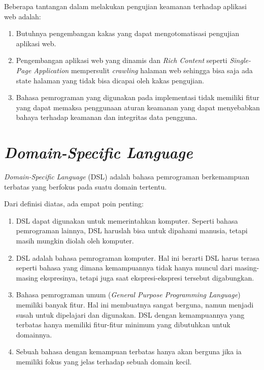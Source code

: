 Beberapa tantangan dalam melakukan pengujian keamanan terhadap aplikasi web adalah:
\begin{enumerate}
    \item Butuhnya pengembangan kakas yang dapat mengotomatisasi pengujian aplikasi web.
    
    \item Pengembangan aplikasi web yang dinamis dan \textit{Rich Content} seperti \textit{Single-Page Application}
    mempersulit \textit{crawling} halaman web sehingga bisa saja ada state halaman yang
    tidak bisa dicapai oleh kakas pengujian.

    \item Bahasa pemrograman yang digunakan pada implementasi tidak memiliki fitur yang
    dapat memaksa penggunaan aturan keamanan yang dapat menyebabkan bahaya terhadap keamanan
    dan integritas data pengguna.
\end{enumerate}

\section{\textit{Domain-Specific Language}}

\textit{Domain-Specific Language} (DSL) adalah bahasa pemrograman berkemampuan terbatas yang
berfokus pada suatu domain tertentu.

Dari definisi diatas, ada empat poin penting:

\begin{enumerate}
    \item DSL dapat digunakan untuk memerintahkan komputer. Seperti bahasa pemrograman lainnya,
    DSL haruslah bisa untuk dipahami manusia, tetapi masih mungkin diolah oleh komputer.

    \item DSL adalah bahasa pemrograman komputer. Hal ini berarti DSL harus terasa seperti
    bahasa yang dimana kemampuannya tidak hanya muncul dari masing-masing ekspresinya,
    tetapi juga saat ekspresi-ekspresi tersebut digabungkan.

    \item Bahasa pemrograman umum (\textit{General Purpose Programming Language}) memiliki banyak fitur.
    Hal ini membuatnya sangat berguna, namun menjadi susah untuk dipelajari dan digunakan.
    DSL dengan kemampuannya yang terbatas hanya memiliki fitur-fitur minimum yang dibutuhkan untuk domainnya.

    \item Sebuah bahasa dengan kemampuan terbatas hanya akan berguna jika ia memiliki
    fokus yang jelas terhadap sebuah domain kecil.
\end{enumerate}

